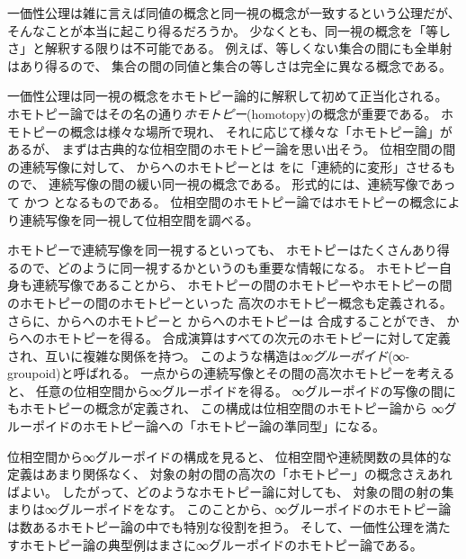 \documentclass[index]{subfiles}
\begin{document}

一価性公理は雑に言えば同値の概念と同一視の概念が一致するという公理だが、
そんなことが本当に起こり得るだろうか。
少なくとも、同一視の概念を「等しさ」と解釈する限りは不可能である。
例えば、等しくない集合の間にも全単射はあり得るので、
集合の間の同値と集合の等しさは完全に異なる概念である。

一価性公理は同一視の概念をホモトピー論的に解釈して初めて正当化される。
ホモトピー論ではその名の通り\emph{ホモトピー}(homotopy)の概念が重要である。
ホモトピーの概念は様々な場所で現れ、
それに応じて様々な「ホモトピー論」があるが、
まずは古典的な位相空間のホモトピー論を思い出そう。
位相空間の間の連続写像に対して、
からへのホモトピーとは
をに「連続的に変形」させるもので、
連続写像の間の緩い同一視の概念である。
形式的には、連続写像であって
かつ
となるものである。
位相空間のホモトピー論ではホモトピーの概念により連続写像を同一視して位相空間を調べる。

ホモトピーで連続写像を同一視するといっても、
ホモトピーはたくさんあり得るので、どのように同一視するかというのも重要な情報になる。
ホモトピー自身も連続写像であることから、
ホモトピーの間のホモトピーやホモトピーの間のホモトピーの間のホモトピーといった
高次のホモトピー概念も定義される。
さらに、からへのホモトピーと
からへのホモトピーは
合成することができ、
からへのホモトピーを得る。
合成演算はすべての次元のホモトピーに対して定義され、互いに複雑な関係を持つ。
このような構造は\emph{∞グルーポイド}(∞-groupoid)と呼ばれる。
一点からの連続写像とその間の高次ホモトピーを考えると、
任意の位相空間から∞グルーポイドを得る。
∞グルーポイドの写像の間にもホモトピーの概念が定義され、
この構成は位相空間のホモトピー論から
∞グルーポイドのホモトピー論への「ホモトピー論の準同型」になる。

位相空間から∞グルーポイドの構成を見ると、
位相空間や連続関数の具体的な定義はあまり関係なく、
対象の射の間の高次の「ホモトピー」の概念さえあればよい。
したがって、どのようなホモトピー論に対しても、
対象の間の射の集まりは∞グルーポイドをなす。
このことから、∞グルーポイドのホモトピー論は数あるホモトピー論の中でも特別な役割を担う。
そして、一価性公理を満たすホモトピー論の典型例はまさに∞グルーポイドのホモトピー論である。
\end{document}
